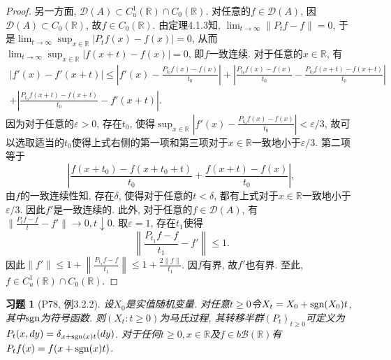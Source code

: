 \documentclass[UTF8,ondside]{ctexart}
\newtheorem{exercise}{习题}[section]
\newcommand{\h}{\mathscr}
\newcommand{\kx}{\mathbb}
\newcommand{\sgn}{\text{\rm sgn}}
\numberwithin{equation}{section}
\begin{document}
\begin{proof}
			另一方面, $\h D(A)\subset C_u^1(\kx R)\cap C_0(\kx R)$. 对任意的$f\in \h D(A)$, 因$\h D(A)\subset C_0(\kx R)$, 故$f\in C_0(\kx R)$. 由定理4.1.3知, $\lim_{t\rightarrow\infty}\|P_t f-f\|=0$, 于是$\lim_{t\rightarrow\infty}\sup_{x\in\kx R}|P_tf(x)-f(x)|=0$, 从而$\lim_{t\rightarrow\infty}\sup_{x\in\kx R}|f(x+t)-f(x)|=0$, 即$f$一致连续.  对于任意的$x\in\kx R$, 有
			\[\begin{aligned}
				|f'(x)-f'(x+t)|\leq 
				\left|f'(x)-\frac{P_{t_0}f(x)-f(x)}{t_0}\right|
				+\left|
				\frac{P_{t_0}f(x)-f(x)}{t_0}-\frac{P_{t_0}f(x+t)-f(x+t)}{t_0}\right|\\
				+\left|
				\frac{P_{t_0}f(x+t)-f(x+t)}{t_0}-f'(x+t)
				\right|.
			\end{aligned}
			\]
			因为对于任意的$\varepsilon>0$, 存在$t_0$, 使得$\sup_{x\in\kx R}\left|f'(x)-\frac{P_{t_0}f(x)-f(x)}{t_0}\right|<\varepsilon/3$, 故可以选取适当的$t_0$使得上式右侧的第一项和第三项对于$x\in\kx R$一致地小于$\varepsilon/3$. 第二项等于
			\[
				\left|
				\frac{f(x+t_0)-f(x+t_0+t)}{t_0}+\frac{f(x+t)-f(x)}{t_0}
				\right|,
			\]
			由$f$的一致连续性知, 存在$\delta$, 使得对于任意的$t<\delta$, 都有上式对于$x\in\kx R$一致地小于$\varepsilon/3$. 因此$f'$是一致连续的. 此外, 对于任意的$f\in\h D(A)$, 有$\|\frac{P_t f-f}{t}-f'\|\rightarrow 0,t\downarrow 0$. 取$\varepsilon =1$, 存在$t_1$使得
			\[
				\left\|
				\frac{P_{t_1}f-f}{t_1}-f'
				\right\|\leq 1.
			\]
			因此$\|f'\|\leq 1+\left\|\frac{P_{t_1}f-f}{t_1}\right\|\leq 1+\frac{2\|f\|}{t_1}$. 因$f$有界, 故$f'$也有界. 至此, $f\in C_u^1(\kx R)\cap C_0(\kx R)$.
	\end{proof}
	\begin{exercise}[P78, 例3.2.2]
		设$X_0$是实值随机变量. 对任意$t\geq 0$令$X_t=X_0+\sgn(X_0)t$,其中$\sgn$为符号函数. 则$(X_t:t\geq 0)$为马氏过程, 其转移半群$(P_t)_{t\geq 0}$可定义为$P_t(x,dy)=\delta_{x+\sgn(x)t}(dy)$. 对于任何$t\geq 0,x\in\kx R$及$f\in b\h B(\kx R)$有$P_t f(x)=f(x+\sgn(x)t)$.
	\end{exercise}
\end{document}
